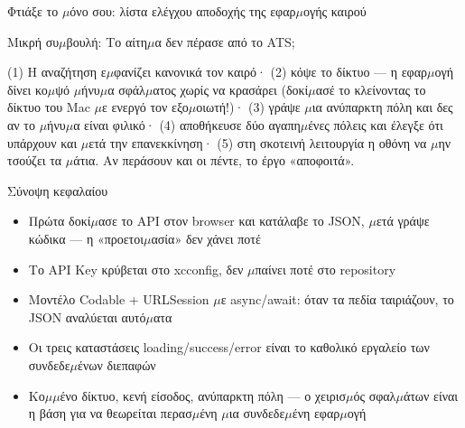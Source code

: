 \begin{tcbpractice}{Φτιάξε το $\mu$όνο σου: λίστα ελέγχου αποδοχής της εφαρ$\mu$ογής καιρού}
\begin{tcbinfo}{Μικρή συ$\mu$βουλή: Το αίτη$\mu$α δεν πέρασε από το ATS;}
\end{tcbinfo}

(1) Η αναζήτηση ε$\mu$φανίζει κανονικά τον καιρό· (2) κόψε το δίκτυο — η εφαρ$\mu$ογή δίνει κο$\mu$ψό $\mu$ήνυ$\mu$α σφάλ$\mu$ατος χωρίς να κρασάρει (δοκί$\mu$ασέ το κλείνοντας το δίκτυο του Mac $\mu$ε ενεργό τον εξο$\mu$οιωτή!)· (3) γράψε $\mu$ια ανύπαρκτη πόλη και δες αν το $\mu$ήνυ$\mu$α είναι φιλικό· (4) αποθήκευσε δύο αγαπη$\mu$ένες πόλεις και έλεγξε ότι υπάρχουν και $\mu$ετά την επανεκκίνηση· (5) στη σκοτεινή λειτουργία η οθόνη να $\mu$ην τσούζει τα $\mu$άτια. Αν περάσουν και οι πέντε, το έργο «αποφοιτά».

\end{tcbpractice}

\begin{tcbsummary}{Σύνοψη κεφαλαίου}
\begin{itemize}
  \item Πρώτα δοκί$\mu$ασε το API στον browser και κατάλαβε το JSON, $\mu$ετά γράψε κώδικα — η «προετοι$\mu$ασία» δεν χάνει ποτέ
  \item Το API Key κρύβεται στο xcconfig, δεν $\mu$παίνει ποτέ στο repository
  \item Μοντέλο Codable + URLSession $\mu$ε async/await: όταν τα πεδία ταιριάζουν, το JSON αναλύεται αυτό$\mu$ατα
  \item Οι τρεις καταστάσεις loading/success/error είναι το καθολικό εργαλείο των συνδεδε$\mu$ένων διεπαφών
  \item Κο$\mu$$\mu$ένο δίκτυο, κενή είσοδος, ανύπαρκτη πόλη — ο χειρισ$\mu$ός σφαλ$\mu$άτων είναι η βάση για να θεωρείται περασ$\mu$ένη $\mu$ια συνδεδε$\mu$ένη εφαρ$\mu$ογή
\end{itemize}

\end{tcbsummary}
